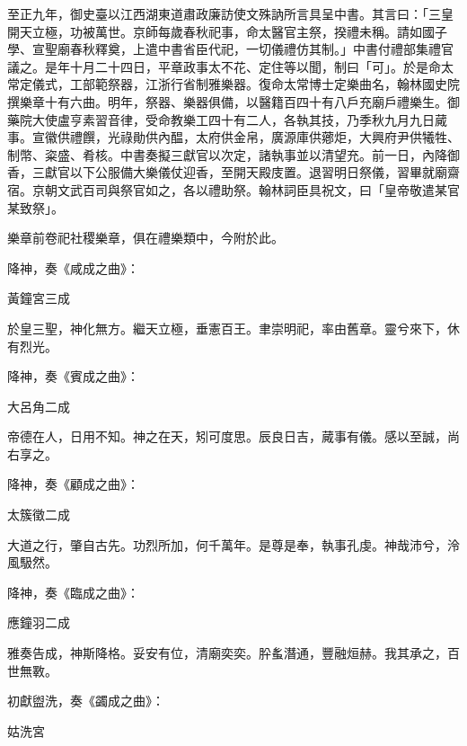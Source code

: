 \begin{pinyinscope}
 至正九年，御史臺以江西湖東道肅政廉訪使文殊訥所言具呈中書。其言曰：「三皇開天立極，功被萬世。京師每歲春秋祀事，命太醫官主祭，揆禮未稱。請如國子學、宣聖廟春秋釋奠，上遣中書省臣代祀，一切儀禮仿其制。」中書付禮部集禮官議之。是年十月二十四日，平章政事太不花、定住等以聞，制曰「可」。於是命太常定儀式，工部範祭器，江浙行省制雅樂器。復命太常博士定樂曲名，翰林國史院撰樂章十有六曲。明年，祭器、樂器俱備，以醫籍百四十有八戶充廟戶禮樂生。御藥院大使盧亨素習音律，受命教樂工四十有二人，各執其技，乃季秋九月九日蕆事。宣徽供禮饌，光祿勛供內醖，太府供金帛，廣源庫供薌炬，大興府尹供犧牲、制幣、粢盛、肴核。中書奏擬三獻官以次定，諸執事並以清望充。前一日，內降御香，三獻官以下公服備大樂儀仗迎香，至開天殿庋置。退習明日祭儀，習畢就廟齋宿。京朝文武百司與祭官如之，各以禮助祭。翰林詞臣具祝文，曰「皇帝敬遣某官某致祭」。



 樂章前卷祀社稷樂章，俱在禮樂類中，今附於此。



 降神，奏《咸成之曲》：



 黃鐘宮三成



 於皇三聖，神化無方。繼天立極，垂憲百王。聿崇明祀，率由舊章。靈兮來下，休有烈光。



 降神，奏《賓成之曲》：



 大呂角二成



 帝德在人，日用不知。神之在天，矧可度思。辰良日吉，蕆事有儀。感以至誠，尚右享之。



 降神，奏《顧成之曲》：



 太簇徵二成



 大道之行，肇自古先。功烈所加，何千萬年。是尊是奉，執事孔虔。神哉沛兮，泠風馺然。



 降神，奏《臨成之曲》：



 應鐘羽二成



 雅奏告成，神斯降格。妥安有位，清廟奕奕。肸蚃潛通，豐融烜赫。我其承之，百世無斁。



 初獻盥洗，奏《蠲成之曲》：



 姑洗宮




\end{pinyinscope}
